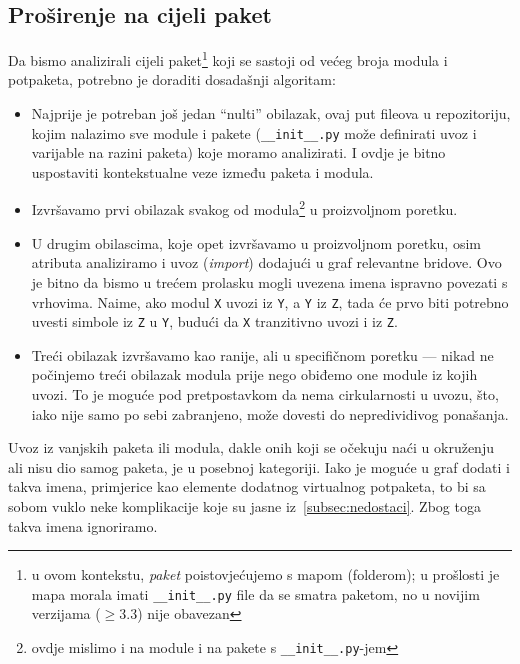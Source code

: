\subsection{Proširenje na cijeli paket}
Da bismo analizirali cijeli paket\footnote{u ovom kontekstu, \emph{paket} poistovjećujemo s
mapom (folderom); u prošlosti je mapa
morala imati \texttt{__init__.py} file da se smatra paketom, no u novijim verzijama
($\ge$3.3) nije obavezan}
koji se sastoji od većeg broja modula i potpaketa, potrebno je doraditi dosadašnji algoritam:
\begin{itemize}
\item Najprije je potreban još jedan \enquote{nulti} obilazak, ovaj put fileova u repozitoriju, kojim
nalazimo sve module i pakete (\texttt{__init__.py} može definirati uvoz i varijable na razini paketa)
koje moramo analizirati. I ovdje je bitno uspostaviti kontekstualne veze između paketa i modula.

\item Izvršavamo prvi obilazak svakog od modula\footnote{ovdje mislimo i na module i na pakete s
\texttt{__init__.py}-jem}
u proizvoljnom poretku.

\item U drugim obilascima, koje opet izvršavamo u proizvoljnom poretku, osim atributa analiziramo i
uvoz (\emph{import}) dodajući u graf relevantne bridove.
Ovo je bitno da bismo u trećem prolasku mogli uvezena imena ispravno povezati s vrhovima. Naime,
ako modul \texttt{X} uvozi iz \texttt{Y}, a \texttt{Y} iz \texttt{Z}, tada će prvo biti potrebno
uvesti simbole iz \texttt{Z} u \texttt{Y}, budući da \texttt{X} tranzitivno
uvozi i iz \texttt{Z}.

\item Treći obilazak izvršavamo kao ranije, ali u specifičnom poretku --- nikad
ne počinjemo treći obilazak modula prije nego obiđemo one module iz kojih uvozi.
To je moguće pod pretpostavkom da nema cirkularnosti u uvozu, što, iako nije
samo po sebi zabranjeno, može dovesti do nepredividivog ponašanja.

\end{itemize}

Uvoz iz vanjskih paketa ili modula, dakle onih koji se
očekuju naći u okruženju ali nisu dio samog paketa, je u posebnoj kategoriji.
Iako je moguće u graf dodati i takva imena, primjerice kao elemente
dodatnog virtualnog potpaketa, to bi sa sobom vuklo neke
komplikacije koje su jasne iz~\ref{subsec:nedostaci}. Zbog toga
takva imena ignoriramo.



